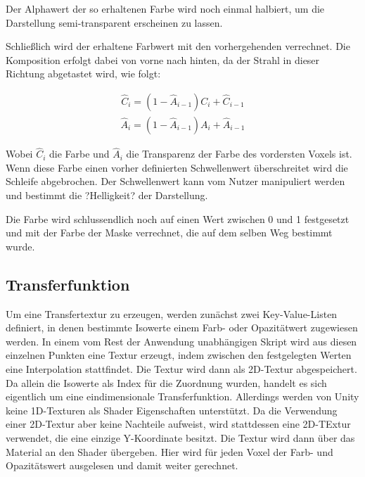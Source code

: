 Der Alphawert der so erhaltenen Farbe wird noch einmal halbiert, um die Darstellung semi-transparent erscheinen zu lassen.

Schließlich wird der erhaltene Farbwert mit den vorhergehenden verrechnet. Die Komposition erfolgt dabei von vorne nach hinten, da der Strahl in dieser Richtung abgetastet wird, wie folgt:

\begin{align}
\hat{C}_{i}=(1-\hat{A}_{i-1})C_{i}+\hat{C}_{i-1}
\end{align}
\begin{align}
\hat{A}_{i}=(1-\hat{A}_{i-1})A_{i}+\hat{A}_{i-1}
\end{align}

Wobei $\hat{C}_{i}$ die Farbe und $\hat{A}_{i}$ die Transparenz der Farbe des vordersten Voxels ist.
Wenn diese Farbe einen vorher definierten Schwellenwert überschreitet wird die Schleife abgebrochen. Der Schwellenwert kann vom Nutzer manipuliert werden und bestimmt die ?Helligkeit? der Darstellung.

Die Farbe wird schlussendlich noch auf einen Wert zwischen 0 und 1 festgesetzt und mit der Farbe der Maske verrechnet, die auf dem selben Weg bestimmt wurde.

\subsection{Transferfunktion}
\label{transfer}


Um eine Transfertextur zu erzeugen, werden zunächst zwei Key-Value-Listen definiert, in denen bestimmte Isowerte einem Farb- oder Opazitätwert zugewiesen werden. In einem vom Rest der Anwendung unabhängigen Skript wird aus diesen einzelnen Punkten eine Textur erzeugt, indem zwischen den festgelegten Werten eine Interpolation stattfindet.
Die Textur wird dann als 2D-Textur abgespeichert. Da allein die Isowerte als Index für die Zuordnung wurden, handelt es sich eigentlich um eine eindimensionale Transferfunktion. 
Allerdings werden von Unity keine 1D-Texturen als Shader Eigenschaften unterstützt. Da die Verwendung einer 2D-Textur aber keine Nachteile aufweist, wird stattdessen eine 2D-TExtur verwendet, die eine einzige Y-Koordinate besitzt. 
Die Textur wird dann über das Material an den Shader übergeben. Hier wird für jeden Voxel der Farb- und Opazitätswert ausgelesen und damit weiter gerechnet. 

